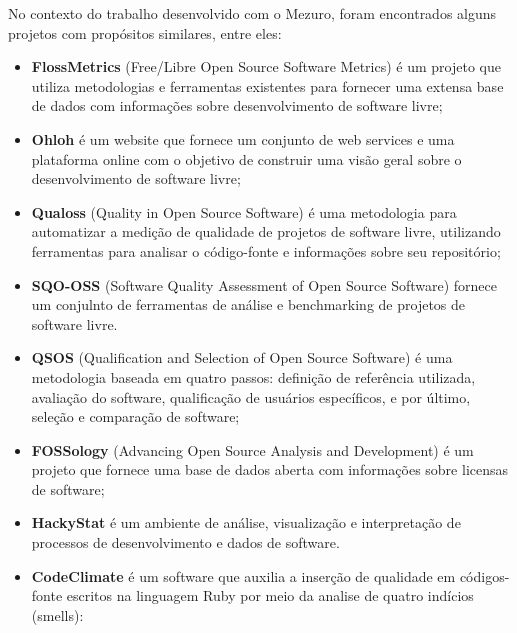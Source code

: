 

No contexto do trabalho desenvolvido com o Mezuro, foram encontrados alguns projetos com propósitos similares\cite{meirelles2010mezuro}, entre eles:

\begin{itemize}
\item \textbf{FlossMetrics} (Free/Libre Open Source Software Metrics) é um projeto que utiliza metodologias e ferramentas existentes para fornecer  uma extensa base de dados com informações sobre desenvolvimento de software livre;
\item \textbf{Ohloh} é um website que fornece um conjunto de web services e uma plataforma online com o objetivo de construir uma visão geral sobre o desenvolvimento de software livre;
\item \textbf{Qualoss} (Quality in Open Source Software) é  uma metodologia para automatizar a medição de qualidade de projetos de software livre, utilizando ferramentas para analisar o código-fonte e informações sobre seu repositório;
\item \textbf{SQO-OSS} (Software Quality Assessment of Open Source Software) fornece um conjulnto de ferramentas de análise e benchmarking de projetos de software livre.
\item \textbf{QSOS} (Qualification and Selection of Open Source Software) é uma metodologia baseada em quatro passos: definição de referência utilizada, avaliação do software, qualificação de usuários específicos, e por último, seleção e comparação de software;
\item \textbf{FOSSology} (Advancing Open Source Analysis and Development) é um projeto que fornece uma base de dados aberta com informações sobre licensas de software;
\item \textbf{HackyStat} é um ambiente de análise, visualização e interpretação de processos de desenvolvimento e dados de software.
\item \textbf{CodeClimate} é um software que auxilia a inserção de qualidade em códigos-fonte escritos na linguagem Ruby por meio da analise de quatro indícios (smells): 

\end{itemize}
